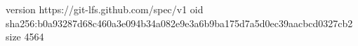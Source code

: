 version https://git-lfs.github.com/spec/v1
oid sha256:b0a93287d68c460a3e094b34a082e9e3a6b9ba175d7a5d0ec39aacbcd0327cb2
size 4564
